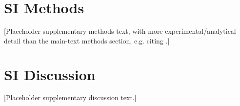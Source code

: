 \section{SI Methods\label{ssec:ch2-si-methods}}
[Placeholder supplementary methods text, with more experimental/analytical
detail than the main-text methods section, e.g. citing \cite{Placeholder2015Book}.]

\section{SI Discussion}
[Placeholder supplementary discussion text.]
